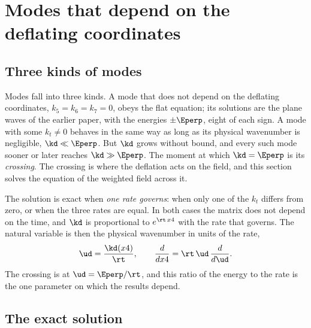\section{Modes that depend on the deflating coordinates}
\label{sec:modes}

\subsection{Three kinds of modes}

Modes fall into three kinds. A mode that does not depend on the deflating coordinates,
$k_5=k_6=k_7=0$, obeys the flat equation; its solutions are the plane waves of the earlier paper, with
the energies $\pm\Eperp$, eight of each sign. A mode with some $k_t\ne0$ behaves in the same way as
long as its physical wavenumber is negligible, $\kd\ll\Eperp$. But $\kd$ grows without bound, and
every such mode sooner or later reaches $\kd\gg\Eperp$. The moment at which $\kd=\Eperp$ is its
\emph{crossing}.  The crossing is where the deflation acts on the field, and
this section solves the equation of the weighted field across it.

The solution is exact when \emph{one rate governs}: when only one of the $k_t$ differs from zero, or
when the three rates are equal. In both cases the matrix  does not
depend on the time, and $\kd$ is proportional to $e^{\rt\,x4}$ with the rate that governs. The natural
variable is then the physical wavenumber in units of the rate,
\begin{equation}
\ud=\frac{\kd(x4)}{\rt},\qquad\frac{d}{dx4}=\rt\,\ud\,\frac{d}{d\ud}.
\label{eq:ud}
\end{equation}
The crossing is at $\ud=\Eperp/\rt$, and this ratio of the energy to the rate is the one parameter
on which the results depend.

\subsection{The exact solution}

